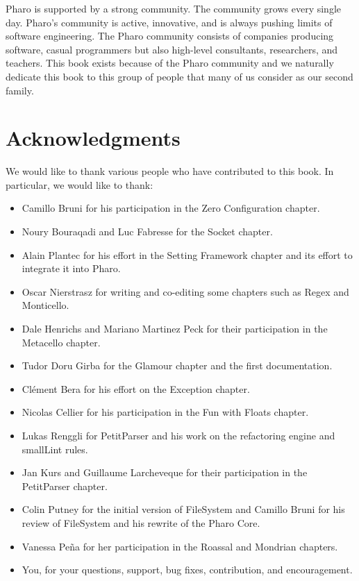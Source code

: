 \documentclass[a4paper,10pt,twoside]{book}
\begin{document}
Pharo is supported by a strong community. The community grows every single day. Pharo's community is active, innovative, and is always pushing limits of software engineering. The Pharo community consists of companies producing software, casual programmers but also high-level consultants, researchers, and teachers.
This book exists because of the Pharo community and we naturally dedicate this book to this group of people that many of us consider as our second family.


\section*{Acknowledgments}

We would like to thank various people who have contributed to this book. In particular, we would like to thank:
\begin{itemize}
\item Camillo Bruni for his participation in the Zero Configuration chapter.
\item Noury Bouraqadi and Luc Fabresse for the Socket chapter.
\item Alain Plantec for his effort in the Setting Framework chapter and its effort to integrate it into Pharo.
\item Oscar Nierstrasz for writing and co-editing some chapters such as Regex and Monticello.
\item Dale Henrichs and Mariano Martinez Peck for their participation in the Metacello chapter.
\item Tudor Doru Girba for the Glamour chapter and the first documentation.
\item Cl\'ement Bera for his effort on the Exception chapter.
\item Nicolas Cellier for his participation in the Fun with Floats chapter.
\item Lukas Renggli for PetitParser and his work on the refactoring engine and smallLint rules. 
\item Jan Kurs and Guillaume Larcheveque for their participation in the PetitParser chapter.
\item Colin Putney for the initial version of FileSystem and Camillo Bruni for his review of FileSystem and his rewrite of the Pharo Core.
\item Vanessa Pe\~na for her participation in the Roassal and Mondrian chapters.
\item You, for your questions, support, bug fixes, contribution, and encouragement.
\end{itemize}
\end{document}
